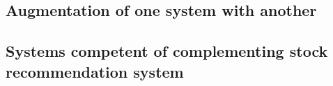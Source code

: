 \documentclass[10pt,twoside,english,a4paper]{article}
\begin{document}
\subsection{Augmentation of one system with another}

\subsection{Systems competent of complementing stock recommendation system}


\newpage



\end{document}

